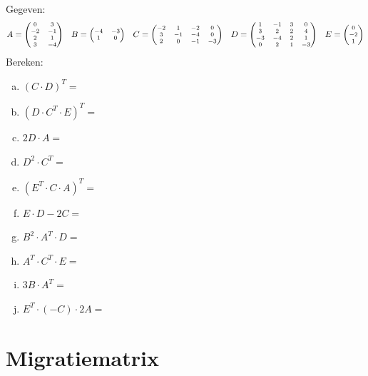 \documentclass[12pt,twoside]{article}
\begin{document}
\begin{oefening}\\
Gegeven:
$$
\scriptsize
A=\begin{pmatrix}
  0 & 3\\
  -2 & -1\\
  2 & 1\\
  3 & -4
\end{pmatrix}
\quad
B=\begin{pmatrix}
  -4 & -3\\
  1 & 0\\
\end{pmatrix}
\quad
C=\begin{pmatrix}
  -2 & 1 & -2 & 0\\
  3 & -1 & -4 & 0\\
  2 & 0 & -1 & -3\\
\end{pmatrix}
\quad
D=\begin{pmatrix}
  1 & -1 & 3 & 0\\
  3 & 2 & 2 & 4\\
  -3 & -4 & 2 & 1\\
  0 & 2 & 1 & -3\\
\end{pmatrix}
\quad
E=\begin{pmatrix}
  0\\
  -2\\
  1\\
\end{pmatrix}
$$
Bereken:
\begin{multicols}{2}
  \begin{enumerate}[(a)]
    \itemsep1em
    \item $(C\cdot D)^T=$
    \item $(D\cdot C^T\cdot E)^T=$
    \item $2D\cdot A=$
    \item $D^2\cdot C^T=$
    \item $(E^T\cdot C\cdot A)^T=$
    \item $E\cdot D - 2C=$
    \item $B^2\cdot A^T\cdot D=$
    \item $A^T\cdot C^T\cdot E=$
    \item $3B\cdot A^T=$
    \item $E^T\cdot(-C)\cdot 2A=$
  \end{enumerate}
\end{multicols}
\end{oefening}

\pagebreak
\section{Migratiematrix}
\end{document}
